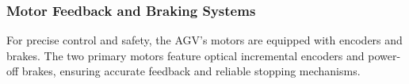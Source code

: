 \documentclass[../../main]{subfiles}
\begin{document}

    
    
\newpage

\subsubsection{Motor Feedback and Braking Systems}
For precise control and safety, the AGV's motors are equipped with encoders and brakes. 
The two primary motors feature optical incremental encoders and power-off brakes, 
ensuring accurate feedback and reliable stopping mechanisms.
\end{document}
